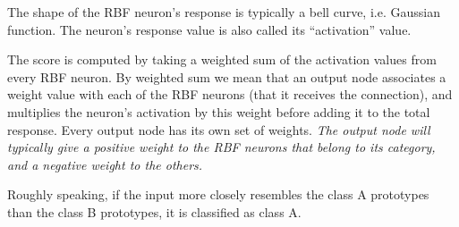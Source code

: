  The shape of the RBF neuron’s response is typically a bell curve,
i.e. Gaussian function. The neuron’s response value is also called its
“activation” value.

The score is computed by taking a weighted sum of the activation values from
every RBF neuron. By weighted sum we mean that an output node associates a
weight value with each of the RBF neurons (that it receives the connection), and
multiplies the neuron’s activation by this weight before adding it to the total
response.  Every output node has its own set of weights. {\it The output node
will typically give a positive weight to the RBF neurons that belong to its
category, and a negative weight to the others.}

Roughly speaking, if the input more closely resembles the class A prototypes
than the class B prototypes, it is classified as class A.

